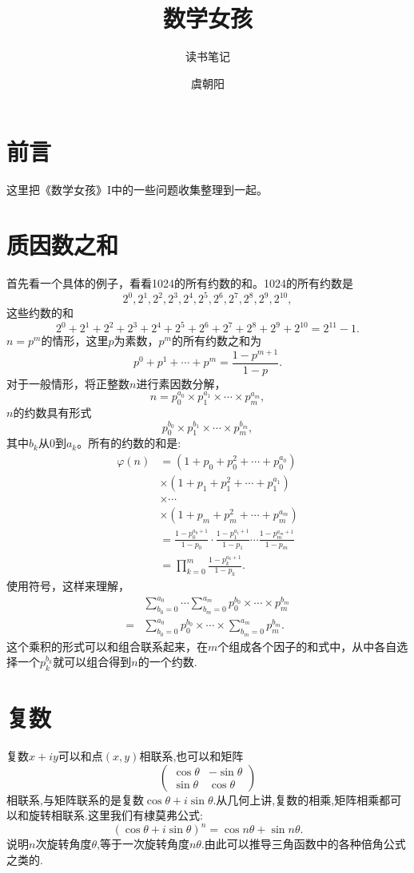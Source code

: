 \documentclass[cn]{elegantbook}
\title{数学女孩}
\subtitle{读书笔记}
\author{虞朝阳}
\institute{西北工业大学}
\begin{document}
\maketitle

\chapter*{前言}
这里把《数学女孩》I\cite{mathgirl2016}中的一些问题收集整理到一起。


\tableofcontents
\mainmatter
\hypersetup{pageanchor=true}

\chapter{质因数之和}
首先看一个具体的例子，看看1024的所有约数的和。1024的所有约数是
\[
2^0, 2^1, 2^2, 2^3, 2^4, 2^5, 2^6, 2^7,2^8, 2^9, 2^{10},
\]
这些约数的和
\[
2^0 + 2^1 + 2^2 + 2^3 + 2^4 + 2^5 + 2^6 + 2^7 + 2^8 + 2^9 + 2^{10} = 2^{11}-1.
\]
$n=p^m$的情形，这里$p$为素数，$p^m$的所有约数之和为
\[
p^0 + p^1 + \cdots + p^m = \frac{1-p^{m+1}}{1 - p}.
\]
对于一般情形，将正整数$n$进行素因数分解，
\[
n = p_0^{a_0} \times p_1^{a_1} \times \cdots \times p_m^{a_m},
\]
$n$的约数具有形式
\[
p_0^{b_0} \times p_1^{b_1} \times \cdots \times p_m^{b_m},
\]
其中$b_k$从$0$到$a_k$。所有的约数的和是:
\[
\begin{aligned}
\varphi(n) &= (1 + p_0 + p_0^2 + \cdots + p_0^{a_0}) \\
& \times (1 + p_1 + p_1^2 + \cdots + p_1^{a_1}) \\
& \times \cdots \\
& \times (1 + p_m + p_m^2 + \cdots + p_m^{a_m}) \\
&= \frac{1-p_0^{a_0+1}}{1-p_0}\cdot\frac{1-p_1^{a_1+1}}{1-p_1}\cdots\frac{1-p_m^{a_m+1}}{1-p_m} \\
&= \prod_{k=0}^{m}{\frac{1-p_k^{a_k+1}}{1-p_k}}.
\end{aligned}
\]
使用符号，这样来理解，
\[
\begin{aligned}
&\sum_{b_0=0}^{a_0}\cdots\sum_{b_m=0}^{a_m}{p_0^{b_0} \times \cdots \times p_m^{b_m}} \\
=&\sum_{b_0=0}^{a_0}{p_0^{b_0}} \times \cdots \times \sum_{b_m=0}^{a_m}{p_m^{b_m}}.
\end{aligned}
\]
这个乘积的形式可以和组合联系起来，在$m$个组成各个因子的和式中，从中各自选择一个$p_k^{b_k}$就可以组合得到$n$的一个约数.

\chapter{复数}
复数$x+iy$可以和点$(x,y)$相联系,也可以和矩阵
\[
\begin{pmatrix} \cos{\theta} & -\sin{\theta} \\ \sin{\theta} & \cos{\theta} \end{pmatrix}
\]
相联系,与矩阵联系的是复数$\cos\theta + i\sin\theta$.从几何上讲,复数的相乘,矩阵相乘都可以和旋转相联系.这里我们有棣莫弗公式:
\[
(\cos\theta + i\sin\theta)^n =\cos n\theta + \sin n\theta.
\]
说明$n$次旋转角度$\theta$,等于一次旋转角度$n\theta$.由此可以推导三角函数中的各种倍角公式之类的.
\end{document}
